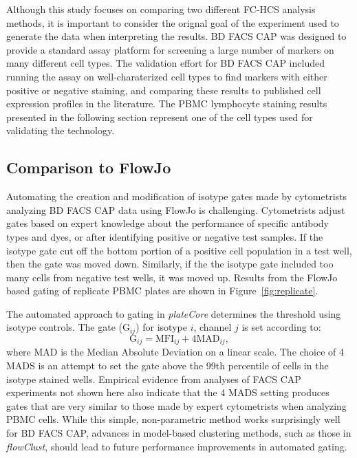 \documentclass[12pt]{article}
\newcommand{\Rpackage}[1]{{\textit{#1}}}
\begin{document}
Although this study focuses on comparing two different FC-HCS analysis methods,
it is important to consider the orignal goal of the experiment used to generate
the data when interpreting the results. BD FACS CAP was designed to provide a
standard assay platform for screening a large number of markers on many
different cell types. The validation effort for BD FACS CAP included running
the assay on well-charaterized cell types to find markers with either positive
or negative staining, and comparing these results to published cell expression
profiles in the literature. The PBMC lymphocyte staining results presented in
the following section represent one of the cell types used for validating the
technology.


\subsection*{Comparison to FlowJo}

Automating the creation and modification of isotype gates made by cytometrists
analyzing BD FACS CAP data using FlowJo is challenging. Cytometrists adjust
gates based on expert knowledge about the performance of specific antibody
types and dyes, or after identifying positive or negative test samples. If the
isotype gate cut off the bottom portion of a positive cell population in a test
well, then the gate was moved down.  Similarly, if the the isotype gate
included too many cells from negative test wells, it was moved up. Results from
the FlowJo based gating of replicate PBMC plates are shown in
Figure~\ref{fig:replicate}.

The automated approach to gating in \Rpackage{plateCore} determines the
threshold using isotype controls. The gate (G$_{ij}$) for isotype $i$, channel
$j$ is set according to:
\begin{equation}
\text{G}_{ij} = \text{MFI}_{ij} + 4 \text{MAD}_{ij},
\label{isoGate}
\end{equation}
where MAD is the Median Absolute Deviation on a linear scale. The choice of 4
MADS is an attempt to set the gate above the 99th percentile of cells in the
isotype stained wells. Empirical evidence from analyses of FACS CAP experiments
not shown here also indicate that the 4 MADS setting produces gates that are
very similar to those made by expert cytometrists when analyzing PBMC cells.
While this simple, non-parametric method works surprisingly well for BD FACS
CAP, advances in model-based clustering methods, such as those in
\Rpackage{flowClust}, should lead to future performance improvements in
automated gating. 
\end{document}
